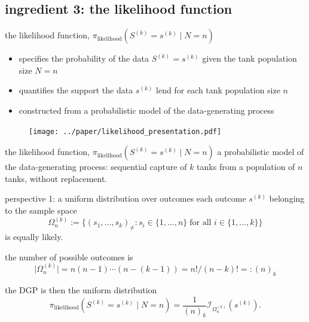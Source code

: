 \documentclass[10pt]{beamer}
\begin{document}
\subsection{ingredient 3: the likelihood function}

\begin{frame}[t]{the likelihood function, $\pi_{\text{likelihood}}(S^{(k)}=s^{(k)} \mid N=n)$}
\begin{itemize}
	\item specifies the probability of the data $S^{(k)}=s^{(k)}$ given the tank population size $N=n$
	\item quantifies the support the data $s^{(k)}$ lend for each tank population size $n$
	\item constructed from a probabilistic model of the data-generating process
\end{itemize}

\begin{figure}[h!]
	\centering
	\texttt{[image: ../paper/likelihood\_presentation.pdf]}
\end{figure}
\end{frame}


\begin{frame}[t]{the likelihood function, $\pi_{\text{likelihood}}(S^{(k)}=s^{(k)} \mid N=n)$}
\alert{a probabilistic model of the data-generating process}: sequential capture of $k$ tanks from a population of $n$ tanks, without replacement.

\pause 

\begin{exampleblock}{perspective 1: a uniform distribution over outcomes}
each outcome $s^{(k)}$ belonging to the sample space
\begin{equation*}
	\Omega_n^{(k)} := \{ (s_1, ..., s_k)_{\neq}  :  s_i \in \{1, ..., n\} \; \text{for all } i \in \{ 1,..., k \} \}
\end{equation*} 
is equally likely.

\pause the number of possible outcomes is
\begin{equation*}
	\lvert \Omega_n^{(k)} \rvert= n(n-1)\cdots (n-(k-1)) = n! / (n-k)! =:(n)_k
\end{equation*}

\pause the DGP is then the uniform distribution
\begin{equation*}
	\pi_{\text{likelihood}}(S^{(k)}=s^{(k)} \mid N=n)=
	\dfrac{1}{(n)_k} \mathcal{I}_{\Omega_n^{(k)}}\left(s^{(k)}\right).
\end{equation*}
\end{exampleblock}
\end{frame}
\end{document}
